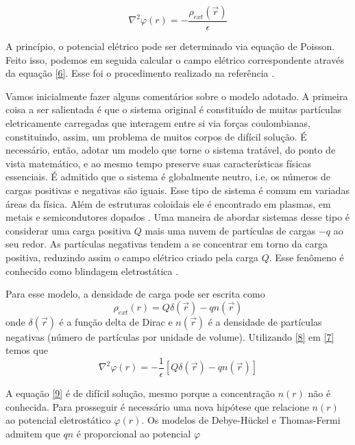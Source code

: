 \documentclass[brazilian,10.7pt,a4paper]{article}
\begin{document}
\begin{multicols}{2}
\begin{equation}\label{7}
\nabla^{2}\varphi(r)=-\frac{\rho_{ext}(\vec{r})}{\epsilon}
\end{equation}
\par A princípio, o potencial elétrico pode ser determinado via equação de Poisson. Feito isso, podemos em seguida calcular o campo elétrico correspondente através da equação \eqref{6}. Esse foi o procedimento realizado na referência \cite{ramos}.
\par Vamos inicialmente fazer alguns comentários sobre o modelo adotado. A primeira coisa a ser salientada é que o sistema original é constituído de muitas partículas eletricamente carregadas que interagem entre si via forças coulombianas, constituindo, assim, um problema de muitos corpos de difícil solução. É necessário, então, adotar um modelo que torne o sistema tratável, do ponto de vista matemático, e ao mesmo tempo preserve suas características físicas essenciais. É admitido que o sistema é globalmente neutro, i.e, os números de cargas positivas e negativas são iguais. Esse tipo de sistema é comum em variadas áreas da física. Além de estruturas coloidais ele é encontrado em plasmas, em metais e semicondutores dopados \cite{platzman}. Uma maneira de abordar sistemas desse tipo é considerar uma carga positiva $Q$ mais uma nuvem de partículas de cargas $-q$ ao seu redor. As partículas negativas tendem a se concentrar em torno da carga positiva, reduzindo assim o campo elétrico criado pela carga $Q$. Esse fenômeno é conhecido como blindagem eletrostática \cite{kittel}.
\par Para esse modelo, a densidade de carga pode ser escrita como
\\
\begin{equation}\label{8}
\rho_{ext}(r)=Q\delta(\vec{r})-qn(\vec{r})
\end{equation}
onde $\delta(\vec{r})$ é a função delta de Dirac e $n(\vec{r})$ é a densidade de partículas negativas (número de partículas por unidade de volume). Utilizando \eqref{8} em \eqref{7} temos que
\\
\begin{equation}\label{9}
\nabla^{2}\varphi(r)=-\frac{1}{\epsilon}[Q\delta(\vec{r})-qn(\vec{r})]
\end{equation}
\par A equação \eqref{9} é de difícil solução, mesmo porque a concentração $n(r)$ não é conhecida. Para prosseguir é necessário uma nova hipótese que relacione $n(r)$ ao potencial eletrostático $\varphi(r)$. Os modelos de Debye-Hückel e Thomas-Fermi admitem que $qn$ é proporcional ao potencial $\varphi$

\end{multicols}
\end{document}
